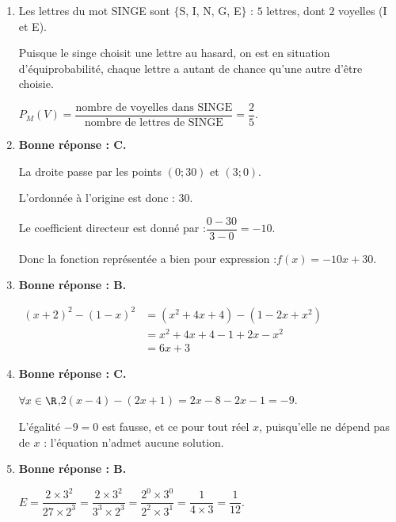 \begin{enumerate}
		\item Les lettres du mot SINGE sont $\{$S, I, N, G, E$\}$ : $5$ lettres, dont $2$ voyelles (I et E).

		Puisque le singe choisit une lettre au hasard, on est en situation d'équiprobabilité, chaque lettre a autant de chance qu'une autre d'être choisie.

		$P_{M}(V)=\dfrac{\text{nombre de voyelles dans SINGE}}{\text{nombre de lettres de SINGE}}=\dfrac{2}{5}$.

		\item \textbf{Bonne réponse : C.}

		La droite passe par les points $(0 ; 30)$ et $(3 ; 0)$.

		L'ordonnée à l'origine est donc : \quad $30$.

		Le coefficient directeur est donné par :\quad $\dfrac{0-30}{3-0}=-10$.

		Donc la fonction représentée a bien pour expression :\quad $f(x)=-10x+30$.

		\item \textbf{Bonne réponse : B.}

		 $\begin{aligned}
		 	(x+2)^{2}-(1-x)^{2}&=\left(x^{2}+4x+4\right)-\left(1-2x+x^{2}\right)\\
		 	&=x^{2}+4x+4-1+2x-x^{2}\\
		 	&=6x+3
		 \end{aligned}$

		\item \textbf{Bonne réponse : C.}

		$\forall x \in \R$,\quad $2(x-4)-(2x+1)=2x-8-2x-1=-9$.

		L'égalité \quad $-9=0$ \quad est fausse, et ce pour tout réel $x$, puisqu'elle ne dépend pas de $x$ : l'équation n'admet aucune solution.

		\item \textbf{Bonne réponse : B.}

		$E=\dfrac{2\times 3^{2}}{27\times 2^{3}}
		=\dfrac{2\times 3^2}{3^3\times 2^3}
		=\dfrac{2^0 \times 3^0}{2^2 \times 3^1}
		=\dfrac{1}{4\times 3}
		=\dfrac{1}{12}$.
	\end{enumerate}
